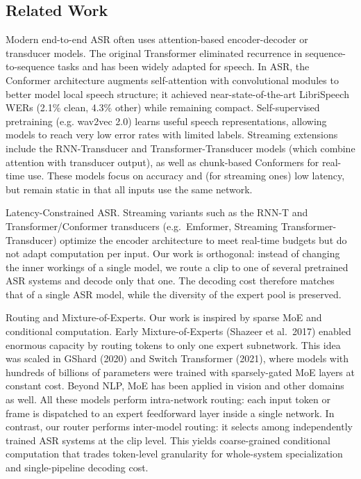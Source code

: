 \documentclass[journal]{IEEEtran}
\begin{document}
\subsection{Related Work}
\label{sec:related_work}

Modern end-to-end ASR often uses attention-based encoder-decoder or transducer models. The original Transformer eliminated recurrence in sequence-to-sequence tasks and has been widely adapted for speech. In ASR, the Conformer architecture augments self-attention with convolutional modules to better model local speech structure; it achieved near-state-of-the-art LibriSpeech WERs (2.1\% clean, 4.3\% other) while remaining compact. Self-supervised pretraining (e.g. wav2vec 2.0) learns useful speech representations, allowing models to reach very low error rates with limited labels. Streaming extensions include the RNN-Transducer and Transformer-Transducer models (which combine attention with transducer output), as well as chunk-based Conformers for real-time use. These models focus on accuracy and (for streaming ones) low latency, but remain static in that all inputs use the same network.

Latency-Constrained ASR. Streaming variants such as the RNN-T and
Transformer/Conformer transducers (e.g.\ Emformer, Streaming
Transformer-Transducer) optimize the encoder architecture to meet
real-time budgets but do not adapt computation per input. Our work
is orthogonal: instead of changing the inner workings of a single
model, we route a clip to one of several pretrained ASR systems and
decode only that one. The decoding cost therefore matches that of a
single ASR model, while the diversity of the expert pool is
preserved.

Routing and Mixture-of-Experts. Our work is inspired by sparse MoE
and conditional computation. Early Mixture-of-Experts (Shazeer et
al.\ 2017) enabled enormous capacity by routing tokens to only one
expert subnetwork. This idea was scaled in GShard (2020) and Switch
Transformer (2021), where models with hundreds of billions of
parameters were trained with sparsely-gated MoE layers at constant
cost. Beyond NLP, MoE has been applied in vision and other domains
as well. All these models perform intra-network routing: each input
token or frame is dispatched to an expert feedforward layer inside a
single network. In contrast, our router performs inter-model
routing: it selects among independently trained ASR systems at the
clip level. This yields coarse-grained conditional computation that
trades token-level granularity for whole-system specialization and
single-pipeline decoding cost.
\end{document}
